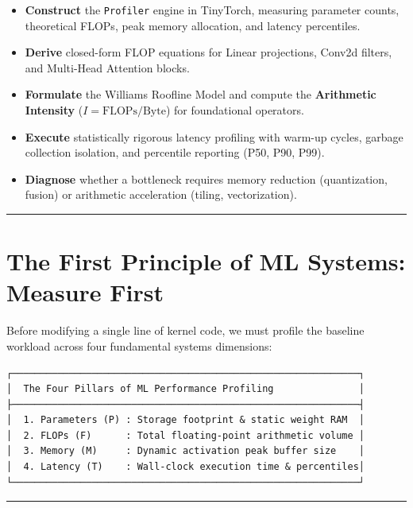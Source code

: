 \documentclass[
  letterpaper,
]{scrbook}
\providecommand{\tightlist}{%
  \setlength{\itemsep}{0pt}\setlength{\parskip}{0pt}}
\begin{document}
\begin{itemize}
\tightlist
\item
  \textbf{Construct} the \texttt{Profiler} engine in TinyTorch,
  measuring parameter counts, theoretical FLOPs, peak memory allocation,
  and latency percentiles.
\item
  \textbf{Derive} closed-form FLOP equations for Linear projections,
  Conv2d filters, and Multi-Head Attention blocks.
\item
  \textbf{Formulate} the Williams Roofline Model and compute the
  \textbf{Arithmetic Intensity} (\(I = \text{FLOPs} / \text{Byte}\)) for
  foundational operators.
\item
  \textbf{Execute} statistically rigorous latency profiling with warm-up
  cycles, garbage collection isolation, and percentile reporting (P50,
  P90, P99).
\item
  \textbf{Diagnose} whether a bottleneck requires memory reduction
  (quantization, fusion) or arithmetic acceleration (tiling,
  vectorization).
\end{itemize}

\begin{center}\rule{0.5\linewidth}{0.5pt}\end{center}

\section{The First Principle of ML Systems: Measure
First}\label{the-first-principle-of-ml-systems-measure-first}

Before modifying a single line of kernel code, we must profile the
baseline workload across four fundamental systems dimensions:

\begin{verbatim}
┌─────────────────────────────────────────────────────────────┐
│  The Four Pillars of ML Performance Profiling               │
├─────────────────────────────────────────────────────────────┤
│  1. Parameters (P) : Storage footprint & static weight RAM  │
│  2. FLOPs (F)      : Total floating-point arithmetic volume │
│  3. Memory (M)     : Dynamic activation peak buffer size    │
│  4. Latency (T)    : Wall-clock execution time & percentiles│
└─────────────────────────────────────────────────────────────┘
\end{verbatim}

\begin{center}\rule{0.5\linewidth}{0.5pt}\end{center}
\end{document}
